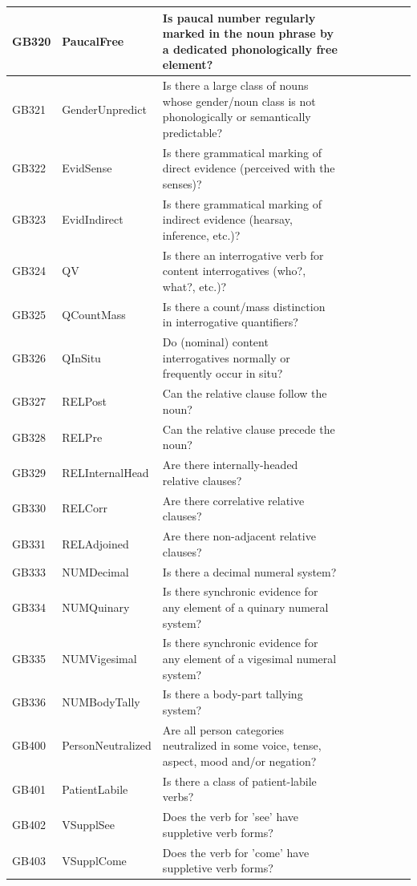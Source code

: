 \documentclass[draft,10pt]{article} %
\begin{document}
\begin{landscape}
\begin{longtable}{| l | p{4cm}| p{12cm}|p{2cm}|p{2cm}|p{2cm}|p{2cm}|p{2cm}|p{2cm}|}
GB320 & PaucalFree&Is paucal number regularly marked in the noun phrase by a dedicated phonologically free element?\\ \hline
GB321 & GenderUnpredict&Is there a large class of nouns whose gender/noun class is not phonologically or semantically predictable?\\ \hline
GB322 & EvidSense&Is there grammatical marking of direct evidence (perceived with the senses)?\\ \hline
GB323 & EvidIndirect&Is there grammatical marking of indirect evidence (hearsay, inference, etc.)?\\ \hline
GB324 & QV&Is there an interrogative verb for content interrogatives (who?, what?, etc.)?\\ \hline
GB325 & QCountMass&Is there a count/mass distinction in interrogative quantifiers?\\ \hline
GB326 & QInSitu&Do (nominal) content interrogatives normally or frequently occur in situ?\\ \hline
GB327 & RELPost&Can the relative clause follow the noun?\\ \hline
GB328 & RELPre&Can the relative clause precede the noun?\\ \hline
GB329 & RELInternalHead&Are there internally-headed relative clauses?\\ \hline
GB330 & RELCorr&Are there correlative relative clauses?\\ \hline
GB331 & RELAdjoined&Are there non-adjacent relative clauses?\\ \hline
GB333 & NUMDecimal&Is there a decimal numeral system?\\ \hline
GB334 & NUMQuinary&Is there synchronic evidence for any element of a quinary numeral system?\\ \hline
GB335 & NUMVigesimal&Is there synchronic evidence for any element of a vigesimal numeral system?\\ \hline
GB336 & NUMBodyTally&Is there a body-part tallying system?\\ \hline
GB400 & PersonNeutralized&Are all person categories neutralized in some voice, tense, aspect, mood and/or negation?\\ \hline
GB401 & PatientLabile&Is there a class of patient-labile verbs?\\ \hline
GB402 & VSupplSee&Does the verb for 'see' have suppletive verb forms?\\ \hline
GB403 & VSupplCome&Does the verb for 'come' have suppletive verb forms?\\ \hline

\end{longtable}
\end{landscape}
\end{document}
